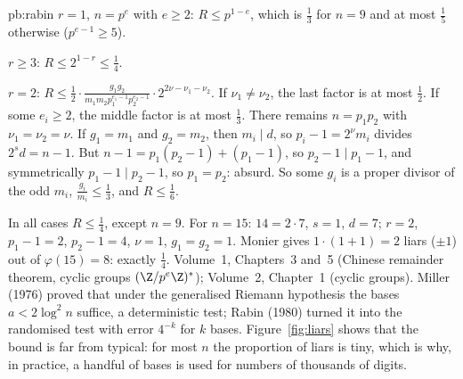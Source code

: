 \begin{solution}{pb:rabin}
\emph{$r=1$}, $n=p^e$ with $e\ge2$: $R\le p^{1-e}$, which is $\frac13$ for $n=9$ and at most $\frac15$ otherwise ($p^{e-1}\ge5$).

\emph{$r\ge3$}: $R\le2^{1-r}\le\frac14$.

\emph{$r=2$}: $R\le\frac12\cdot\frac{g_1g_2}{m_1m_2p_1^{e_1-1}p_2^{e_2-1}}\cdot2^{2\nu-\nu_1-\nu_2}$. If $\nu_1\ne\nu_2$, the last factor is at most
$\frac12$. If some $e_i\ge2$, the middle factor is at most $\frac13$. There remains $n=p_1p_2$ with $\nu_1=\nu_2=\nu$. If
$g_1=m_1$ and $g_2=m_2$, then $m_i\mid d$, so $p_i-1=2^\nu m_i$ divides $2^sd=n-1$. But $n-1=p_1(p_2-1)+(p_1-1)$, so $p_2-1\mid p_1-1$,
and symmetrically $p_1-1\mid p_2-1$, so $p_1=p_2$: absurd. So some $g_i$ is a proper divisor of the odd $m_i$, $\frac{g_i}{m_i}\le\frac13$,
and $R\le\frac16$.

In all cases $R\le\frac14$, except $n=9$. For $n=15$: $14=2\cdot7$, $s=1$, $d=7$; $r=2$, $p_1-1=2$, $p_2-1=4$, $\nu=1$, $g_1=g_2=1$. Monier
gives $1\cdot(1+1)=2$ liars ($\pm1$) out of $\varphi(15)=8$: exactly $\frac14$.
\tools Volume~1, Chapters~3 and~5 (Chinese remainder theorem, cyclic groups $(\Z/p^e\Z)^*$); Volume~2, Chapter~1 (cyclic groups).
\leads Miller (1976) proved that under the generalised Riemann hypothesis the bases $a<2\log^2n$ suffice, a deterministic test;
Rabin (1980) turned it into the randomised test with error $4^{-k}$ for $k$ bases. Figure~\ref{fig:liars} shows that the
bound is far from typical: for most $n$ the proportion of liars is tiny, which is why, in practice, a handful of bases is
used for numbers of thousands of digits.
\end{solution}

